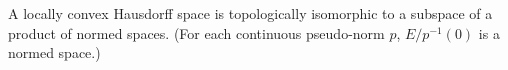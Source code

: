 A locally convex Hausdorff space is topologically isomorphic to a subspace of a product of normed spaces. (For each continuous pseudo-norm $p$, $E/p^{-1}(0)$ is a normed space.)
